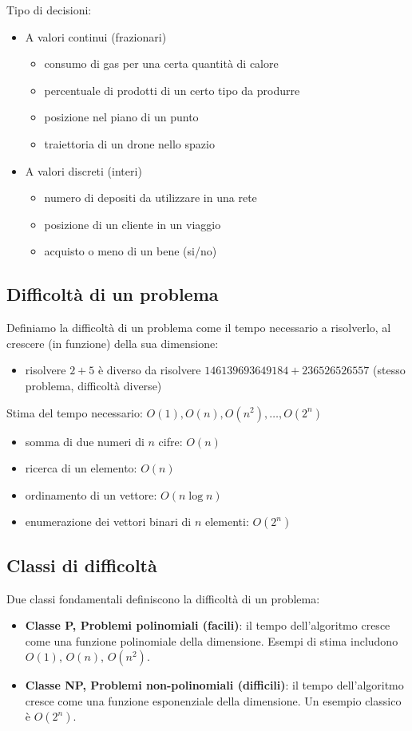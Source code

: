 \documentclass[12pt]{extarticle} %
\begin{document}
\noindent Tipo di decisioni:
\begin{itemize}
    \item A valori continui (frazionari)
    \begin{itemize}
        \item consumo di gas per una certa quantità di calore
        \item percentuale di prodotti di un certo tipo da produrre
        \item posizione nel piano di un punto
        \item traiettoria di un drone nello spazio
    \end{itemize}

    \item A valori discreti (interi)
    \begin{itemize}
        \item numero di depositi da utilizzare in una rete
        \item posizione di un cliente in un viaggio
        \item acquisto o meno di un bene (si/no)
    \end{itemize}
\end{itemize}

\subsection{Difficoltà di un problema}
Definiamo la difficoltà di un problema come il tempo necessario a risolverlo, al crescere (in funzione) della sua dimensione:
\begin{itemize}
    \item risolvere $2+5$ è diverso da risolvere $146139693649184 + 236526526557$ (stesso problema, difficoltà diverse)
\end{itemize}
Stima del tempo necessario: $O(1), O(n), O(n^2),\dots,O(2^n)$
\begin{itemize}
    \item somma di due numeri di $n$ cifre: $O(n)$
    \item ricerca di un elemento: $O(n)$
    \item ordinamento di un vettore: $O(n\log n)$
    \item enumerazione dei vettori binari di $n$ elementi: $O(2^n)$
\end{itemize}

\subsection{Classi di difficoltà}
Due classi fondamentali definiscono la difficoltà di un problema:
\begin{itemize}
    \item \textbf{Classe P, Problemi polinomiali (facili)}: il tempo dell'algoritmo cresce come una funzione polinomiale della dimensione. Esempi di stima includono $O(1)$, $O(n)$, $O(n^2)$.
    \item \textbf{Classe NP, Problemi non-polinomiali (difficili)}: il tempo dell'algoritmo cresce come una funzione esponenziale della dimensione. Un esempio classico è $O(2^n)$.
\end{itemize}
\end{document}
